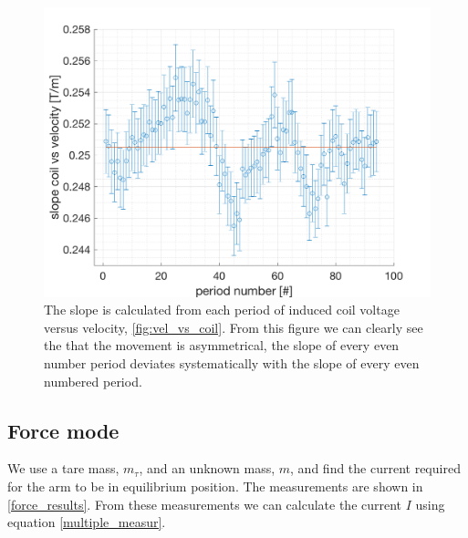 \documentclass[english,a4paper,12pt,reprint]{revtex4-1}
\begin{document}
\begin{figure}[htpb]
    \centering
    \includegraphics[scale=0.44]{slope.png}
    \caption{The slope is calculated from each period of induced coil voltage versus velocity, \vref{fig:vel_vs_coil}. From this figure we can clearly see the that the movement is asymmetrical, the slope of every even number period deviates systematically with the slope of every even numbered period.}
    \label{fig:slope}
\end{figure}

\subsection{Force mode}
We use a tare mass, $m_\tau$, and an unknown mass, $m$, and find the current required for the arm to be in equilibrium position. The measurements are shown in \vref{force_results}. From these measurements we can calculate the current $I$ using equation \eqref{multiple_measur}.
\end{document}
